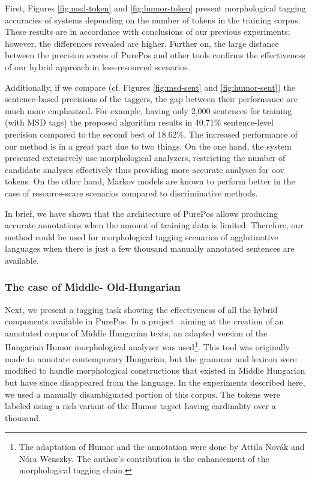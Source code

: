 First, Figures \ref{fig:msd-token} and \ref{fig:humor-token} present morphological tagging accuracies of systems depending on the number of tokens in the training corpus. 
These results are in accordance with conclusions of our previous experiments; however, the differences revealed are higher. 
Further on, the large distance between the precision scores of PurePos and other tools confirms the effectiveness of our  hybrid approach in less-resourced scenarios.


Additionally, if we compare (cf. Figures \ref{fig:msd-sent} and \ref{fig:humor-sent}) the sentence-based precisions of the taggers, the gap between their performance are much more emphasized. 
For example, having only 2,000 sentences for training (with MSD tags) the proposed algorithm results in 40.71\% sentence-level precision compared to the second best of 18.62\%.
The increased performance of our method is in a great part due to two things. 
On the one hand, the system presented extensively use  morphological analyzers, restricting the number of candidate analyses effectively thus providing more accurate analyses for \acrshort{oov} tokens.
On the other hand, Markov models are known to perform better in the case of resource-scare scenarios compared to discriminative methods.

In brief, we have shown that the architecture of PurePos allows producing accurate annotations when the amount of training data is limited. Therefore, our method could be used for morphological tagging scenarios of agglutinative languages when there is just a few thousand manually annotated sentences are available.

\subsubsection{The case of Middle- Old-Hungarian}
\label{sec:oldhungarian}

Next, we present a tagging task showing the effectiveness of all the hybrid components available in PurePos. 
In a project~\cite{NovakOMK,Novak2013} aiming at the creation of an annotated corpus of Middle Hungarian texts, an adapted version of the Hungarian Humor morphological analyzer \cite{NovakOMK} was used\footnote{The adaptation of Humor and the annotation were done by  Attila Novák and Nóra Wenszky. The author's contribution is the enhancement of the morphological tagging chain.}. 
This tool was originally made to annotate contemporary Hungarian, but the grammar and lexicon were modified to handle morphological constructions that existed in Middle Hungarian but have since disappeared from the language. 
In the experiments described here, we used a manually disambiguated portion of this corpus. The tokens were labeled using a rich variant of the Humor tagset having cardinality over a thousand.

